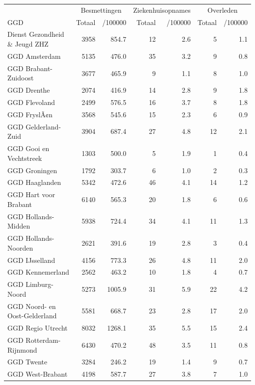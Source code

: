 \documentclass[
  english,
  man,floatsintext]{apa6}
\begin{document}
\begin{table}
\centering\begingroup\fontsize{10}{12}\selectfont

\begin{threeparttable}
\begin{tabular}{lrrrrrr}
\toprule
\multicolumn{1}{c}{ } & \multicolumn{2}{c}{Besmettingen} & \multicolumn{2}{c}{Ziekenhuisopnames} & \multicolumn{2}{c}{Overleden} \\
\cmidrule(l{3pt}r{3pt}){2-3} \cmidrule(l{3pt}r{3pt}){4-5} \cmidrule(l{3pt}r{3pt}){6-7}
GGD & Totaal & /100000 & Totaal & /100000 & Totaal & /100000\\
\midrule
Dienst Gezondheid \& Jeugd ZHZ & 3958 & 854.7 & 12 & 2.6 & 5 & 1.1\\
GGD Amsterdam & 5135 & 476.0 & 35 & 3.2 & 9 & 0.8\\
GGD Brabant-Zuidoost & 3677 & 465.9 & 9 & 1.1 & 8 & 1.0\\
GGD Drenthe & 2074 & 416.9 & 14 & 2.8 & 9 & 1.8\\
GGD Flevoland & 2499 & 576.5 & 16 & 3.7 & 8 & 1.8\\
GGD FryslÃ¢n & 3568 & 545.6 & 15 & 2.3 & 6 & 0.9\\
GGD Gelderland-Zuid & 3904 & 687.4 & 27 & 4.8 & 12 & 2.1\\
GGD Gooi en Vechtstreek & 1303 & 500.0 & 5 & 1.9 & 1 & 0.4\\
GGD Groningen & 1792 & 303.7 & 6 & 1.0 & 2 & 0.3\\
GGD Haaglanden & 5342 & 472.6 & 46 & 4.1 & 14 & 1.2\\
GGD Hart voor Brabant & 6140 & 565.3 & 20 & 1.8 & 6 & 0.6\\
GGD Hollands-Midden & 5938 & 724.4 & 34 & 4.1 & 11 & 1.3\\
GGD Hollands-Noorden & 2621 & 391.6 & 19 & 2.8 & 3 & 0.4\\
GGD IJsselland & 4156 & 773.3 & 26 & 4.8 & 11 & 2.0\\
GGD Kennemerland & 2562 & 463.2 & 10 & 1.8 & 4 & 0.7\\
GGD Limburg-Noord & 5273 & 1005.9 & 31 & 5.9 & 22 & 4.2\\
GGD Noord- en Oost-Gelderland & 5581 & 668.7 & 23 & 2.8 & 17 & 2.0\\
GGD Regio Utrecht & 8032 & 1268.1 & 35 & 5.5 & 15 & 2.4\\
GGD Rotterdam-Rijnmond & 6430 & 470.2 & 48 & 3.5 & 11 & 0.8\\
GGD Twente & 3284 & 246.2 & 19 & 1.4 & 9 & 0.7\\
GGD West-Brabant & 4198 & 587.7 & 27 & 3.8 & 7 & 1.0\\

\end{tabular}
\end{threeparttable}
\end{table}
\end{document}
